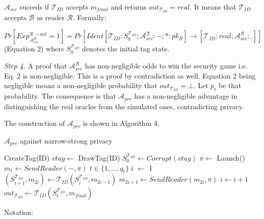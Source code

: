     $\mathcal{A}_{sec}$ succeds if $\mathcal{T}_{ID}$ accepts $m_{final}$ and returns $out_{\mathcal{T}_{ID}} = real$.
    It means that $\mathcal{T}_{ID}$ accepts $\mathcal{B}$ as reader $\mathcal{R}$. Formally:

    $Pr[Exp_{\mathcal{A}_{sec}^{B}}^{\mathcal{R}-aut} = 1] = Pr[Ident[\mathcal{T}_{ID}:S_0^{\mathcal{T}_{ID}}; \mathcal{A}_{sec}^{\mathcal{B}}:-; *:pk_{R}]
    \rightarrow [\mathcal{T}_{ID}:real; \mathcal{A}_{sec}^{\mathcal{B}}:.]]$ (Equation 2) where $S_0^{\mathcal{T}_{ID}}$ denotes the initial tag state.
    
    \textit{Step 4.} A proof that $\mathcal{A}_{sec}^{\mathcal{B}}$ has non-negligible odds to win the security game i.e. Eq. 2 is non-negligible.
    This is a proof by contradiction as well. Equation 2 being negligible means a non-negligible probability that $out_{\mathcal{T}_{ID}} = \bot$.
    Let $p_t$ be that probability. The consequence is that $\mathcal{A}_{prv}$ has a non-negligible advantage in distinguishing the real oracles 
    from the simulated ones, contradicting privacy.

    The construction of $\mathcal{A}_{prv}$ is shown in Algorithm 4.
    
    \begin{algorithm}[H] %
        \centering
        \caption{$\mathcal{A}_{prv}$ against narrow-strong privacy}
        \begin{algorithmic}[1] %
            \State CreateTag(ID)
            \State $vtag \leftarrow$ DrawTag(ID)
            \State $S_0^{\mathcal{T}_{ID}} \gets Corrupt(vtag)$
            \State $\pi \leftarrow$ Launch() 
            \State $m_1 \leftarrow SendReader(-,\pi)$ 
            \State $t \in \{1, ..., q_t\}$
            \State i $\leftarrow$ 1
                \State $(S_{i+1}^{\mathcal{T}_{ID}}, m_{2i}) \gets 
                    \mathcal{T}_{ID}(S_{i}^{\mathcal{T}_{ID}}, m_{2i-1})$ 
                \State $m_{2i+1} \gets SendReader(m_{2i}, \pi)$
                \State $i \gets i+1$
            \EndWhile
            \State $out_{\mathcal{T}_{ID}} \gets \mathcal{T}_{ID}(S_t^{\mathcal{T}_{ID}}, m_{final})$
                \State {}
            \Else
                \State {}
            \EndIf
        \end{algorithmic}
    \end{algorithm}

    Notation: 

